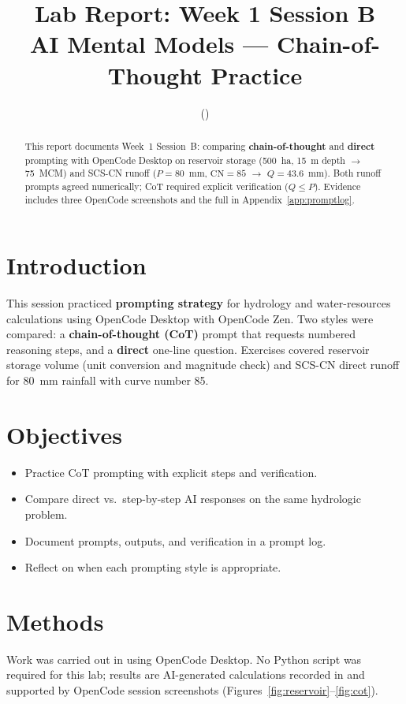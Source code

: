 \documentclass[11pt,a4paper]{article}
\title{Lab Report: Week 1 Session B\\AI Mental Models --- Chain-of-Thought Practice}
\author{\studentname \quad (\studentid)}
\date{\reportdate}
\begin{document}
\maketitle

\begin{abstract}
This report documents Week~1 Session~B: comparing \textbf{chain-of-thought} and \textbf{direct} prompting with OpenCode Desktop on reservoir storage (500~ha, 15~m depth $\rightarrow$ 75~MCM) and SCS-CN runoff ($P=80$~mm, $\mathrm{CN}=85$ $\rightarrow$ $Q=43.6$~mm). Both runoff prompts agreed numerically; CoT required explicit verification ($Q \le P$). Evidence includes three OpenCode screenshots and the full  in Appendix~\ref{app:promptlog}.
\end{abstract}

\section{Introduction}
This session practiced \textbf{prompting strategy} for hydrology and water-resources calculations using OpenCode Desktop with OpenCode Zen. Two styles were compared: a \textbf{chain-of-thought (CoT)} prompt that requests numbered reasoning steps, and a \textbf{direct} one-line question. Exercises covered reservoir storage volume (unit conversion and magnitude check) and SCS-CN direct runoff for 80~mm rainfall with curve number 85.

\section{Objectives}
\begin{itemize}[noitemsep]
  \item Practice CoT prompting with explicit steps and verification.
  \item Compare direct vs.\ step-by-step AI responses on the same hydrologic problem.
  \item Document prompts, outputs, and verification in a prompt log.
  \item Reflect on when each prompting style is appropriate.
\end{itemize}

\section{Methods}
Work was carried out in  using OpenCode Desktop. No Python script was required for this lab; results are AI-generated calculations recorded in  and supported by OpenCode session screenshots (Figures~\ref{fig:reservoir}--\ref{fig:cot}).
\end{document}
